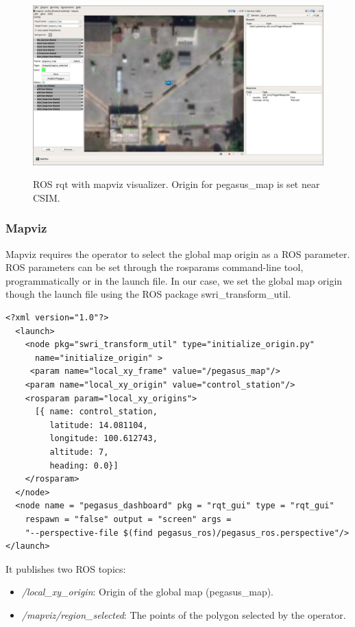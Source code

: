\begin{figure}
	\centering
	\caption[Pegasus presentation dashboard]{\small ROS rqt with mapviz visualizer. Origin for pegasus\_map is set near CSIM.}
	\includegraphics[width=5in]{figures/methodology/presentation/mapviz-1}
	\label{fig:mapviz-screenshot}
\end{figure}


\subsubsection{Mapviz}
Mapviz requires the operator to select the global map origin as a ROS parameter. ROS parameters can be set through the rosparams command-line tool, programmatically or in the launch file. In our case, we set the global map origin though the launch file using the ROS package swri\_transform\_util.


\begin{verbatim}
<?xml version="1.0"?>
  <launch>
    <node pkg="swri_transform_util" type="initialize_origin.py"
      name="initialize_origin" >
     <param name="local_xy_frame" value="/pegasus_map"/>
    <param name="local_xy_origin" value="control_station"/>
    <rosparam param="local_xy_origins">
      [{ name: control_station,
         latitude: 14.081104,
         longitude: 100.612743,
         altitude: 7,
         heading: 0.0}]
    </rosparam>
  </node>
  <node name = "pegasus_dashboard" pkg = "rqt_gui" type = "rqt_gui" 
    respawn = "false" output = "screen" args = 
    "--perspective-file $(find pegasus_ros)/pegasus_ros.perspective"/>
</launch>
\end{verbatim}


It publishes two ROS topics:
\begin{itemize}
	\item \textit{/local\_xy\_origin}: Origin of the global map (pegasus\_map).
	\item \textit{/mapviz/region\_selected}: The points of the polygon selected by the operator.
\end{itemize}

